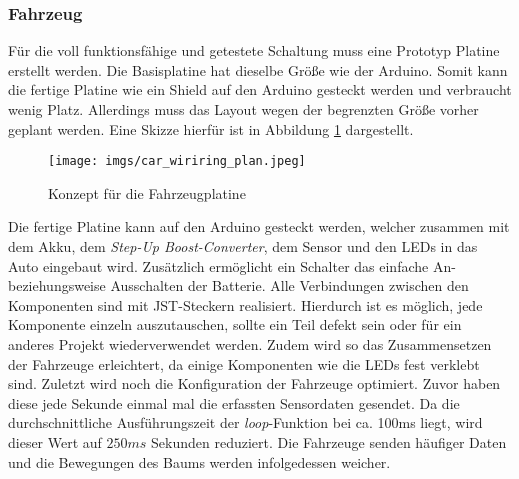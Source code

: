 \documentclass[.../Dokumentation.tex]{subfiles}
\begin{document}
    \subsubsection*{Fahrzeug}
    Für die voll funktionsfähige und getestete Schaltung muss eine Prototyp Platine erstellt werden. Die Basisplatine hat dieselbe Größe wie der Arduino. Somit kann die fertige Platine wie ein Shield auf den Arduino gesteckt werden und verbraucht wenig Platz. Allerdings muss das Layout wegen der begrenzten Größe vorher geplant werden. Eine Skizze hierfür ist in Abbildung \ref{fig-hardware-car-pcb-plan} dargestellt. 
    \begin{figure}[H]
    	\begin{center}
    		\texttt{[image: imgs/car\_wiriring\_plan.jpeg]}
    		\caption{Konzept für die Fahrzeugplatine}
    		\label{fig-hardware-car-pcb-plan}
    	\end{center}
    \end{figure} 
	\noindent
    Die fertige Platine kann auf den Arduino gesteckt werden, welcher zusammen mit dem Akku, dem \textit{Step-Up Boost-Converter}, dem Sensor und den LEDs in das Auto eingebaut wird. Zusätzlich ermöglicht ein Schalter das einfache An- beziehungsweise Ausschalten der Batterie. Alle Verbindungen zwischen den Komponenten sind mit JST-Steckern realisiert. Hierdurch ist es möglich, jede Komponente einzeln auszutauschen, sollte ein Teil defekt sein oder für ein anderes Projekt wiederverwendet werden. Zudem wird so das Zusammensetzen der Fahrzeuge erleichtert, da einige Komponenten wie die LEDs fest verklebt sind.
    Zuletzt wird noch die Konfiguration der Fahrzeuge optimiert. Zuvor haben diese jede Sekunde einmal mal die erfassten Sensordaten gesendet. Da die durchschnittliche Ausführungszeit der \emph{loop}-Funktion bei ca. 100ms liegt, wird dieser Wert auf $250ms$ Sekunden reduziert. Die Fahrzeuge senden häufiger Daten und die Bewegungen des Baums werden infolgedessen weicher.
    
\end{document}
